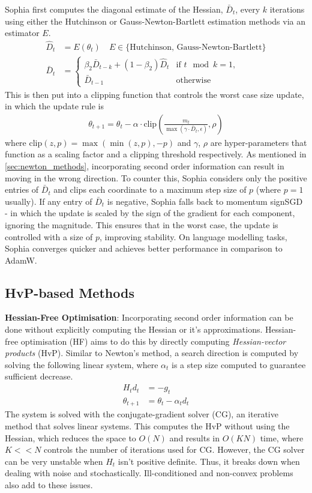Sophia first computes the diagonal estimate of the Hessian, $\bar{D}_t$, every $k$ iterations using either the Hutchinson or Gauss-Newton-Bartlett estimation methods via an estimator $E$. 
\begin{align}
    \hat{D}_t &= E(\theta_t) \quad E \in \{\text{Hutchinson, Gauss-Newton-Bartlett} \} \\
    \bar{D}_t &= 
    \begin{cases}
        \beta_2 \bar{D}_{t-k} + (1 - \beta_2) \hat{D}_t & \text{if } t \mod k = 1, \\
        \bar{D}_{t-1} & \text{otherwise}
    \end{cases}
\end{align}
This is then put into a clipping function that controls the worst case size update, in which the update rule is
\begin{align}
    \theta_{t+1} = \theta_t - \alpha \cdot \text{clip}(\frac{m_t}{\max(\gamma \cdot \bar{D}_t, \epsilon)}, \rho)
\end{align}
where $\text{clip}(z, p) = \max(\min(z, p), -p)$ and $\gamma$, $\rho$ are hyper-parameters that function as a scaling factor and a clipping threshold respectively. As mentioned in \cref{sec:newton_methods}, incorporating second order information can result in moving in the wrong direction. To counter this, Sophia considers only the positive entries of $\bar{D}_t$ and clips each coordinate to a maximum step size of $p$ (where $p = 1$ usually). If any entry of $\bar{D}_t$ is negative, Sophia falls back to momentum signSGD - in which the update is scaled by the sign of the gradient for each component, ignoring the magnitude. This ensures that in the worst case, the update is controlled with a size of $p$, improving stability. On language modelling tasks, Sophia converges quicker and achieves better performance in comparison to AdamW.

\subsection{HvP-based Methods}
\textbf{Hessian-Free Optimisation}: Incorporating second order information can be done without explicitly computing the Hessian or it's approximations. Hessian-free optimisation (HF) aims to do this by directly computing \textit{Hessian-vector products} (HvP). Similar to Newton's method, a search direction is computed by solving the following linear system, where $\alpha_t$ is a step size computed to guarantee sufficient decrease.
\begin{align}
    H_t d_t &= - g_t \\ \label{hf:lin_sys}
    \theta_{t+1} &= \theta_t - \alpha_t d_t
\end{align}
The system is solved with the conjugate-gradient solver (CG), an iterative method that solves linear systems. This computes the HvP without using the Hessian, which reduces the space to $O(N)$ and results in $O(KN)$ time, where $K << N$ controls the number of iterations used for CG. However, the CG solver can be very unstable when $H_t$ isn't positive definite. Thus, it breaks down when dealing with noise and stochastically. Ill-conditioned and non-convex problems also add to these issues.

